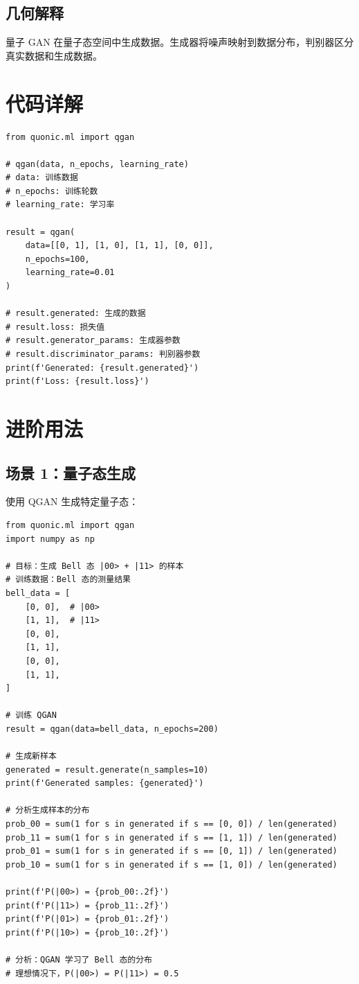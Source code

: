 \documentclass[12pt,a4paper]{article}
\begin{document}
\subsection{几何解释}

量子 GAN 在量子态空间中生成数据。生成器将噪声映射到数据分布，判别器区分真实数据和生成数据。

\section{代码详解}

\begin{verbatim}
from quonic.ml import qgan

# qgan(data, n_epochs, learning_rate)
# data: 训练数据
# n_epochs: 训练轮数
# learning_rate: 学习率

result = qgan(
    data=[[0, 1], [1, 0], [1, 1], [0, 0]],
    n_epochs=100,
    learning_rate=0.01
)

# result.generated: 生成的数据
# result.loss: 损失值
# result.generator_params: 生成器参数
# result.discriminator_params: 判别器参数
print(f'Generated: {result.generated}')
print(f'Loss: {result.loss}')
\end{verbatim}

\section{进阶用法}

\subsection{场景 1：量子态生成}

使用 QGAN 生成特定量子态：

\begin{verbatim}
from quonic.ml import qgan
import numpy as np

# 目标：生成 Bell 态 |00> + |11> 的样本
# 训练数据：Bell 态的测量结果
bell_data = [
    [0, 0],  # |00>
    [1, 1],  # |11>
    [0, 0],
    [1, 1],
    [0, 0],
    [1, 1],
]

# 训练 QGAN
result = qgan(data=bell_data, n_epochs=200)

# 生成新样本
generated = result.generate(n_samples=10)
print(f'Generated samples: {generated}')

# 分析生成样本的分布
prob_00 = sum(1 for s in generated if s == [0, 0]) / len(generated)
prob_11 = sum(1 for s in generated if s == [1, 1]) / len(generated)
prob_01 = sum(1 for s in generated if s == [0, 1]) / len(generated)
prob_10 = sum(1 for s in generated if s == [1, 0]) / len(generated)

print(f'P(|00>) = {prob_00:.2f}')
print(f'P(|11>) = {prob_11:.2f}')
print(f'P(|01>) = {prob_01:.2f}')
print(f'P(|10>) = {prob_10:.2f}')

# 分析：QGAN 学习了 Bell 态的分布
# 理想情况下，P(|00>) = P(|11>) = 0.5
\end{verbatim}
\end{document}
